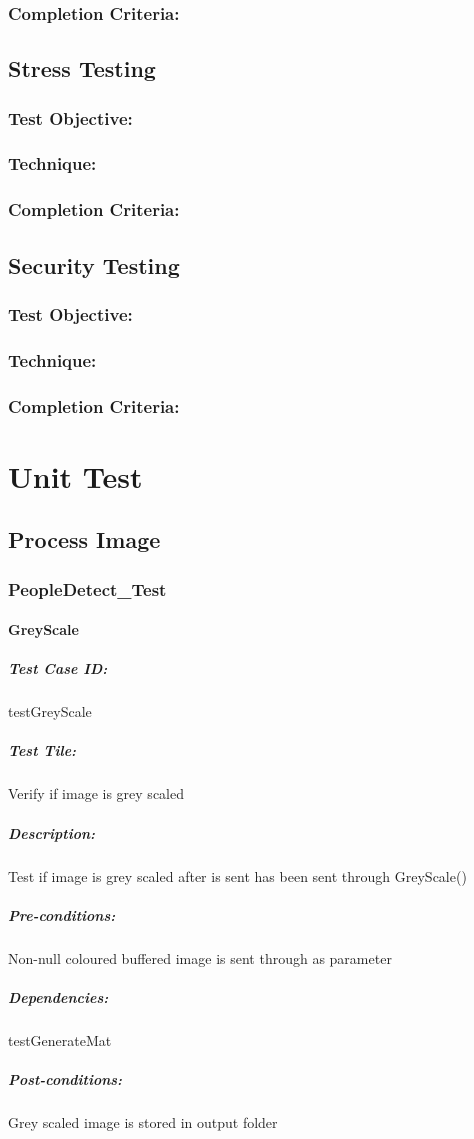 \documentclass[a4paper,12pt]{report}
\begin{document}
			\subsubsection {Completion Criteria:}
			
		\subsection {Stress Testing}
			\subsubsection {Test Objective:}
			\subsubsection {Technique:}
			\subsubsection {Completion Criteria:}
			
		\subsection {Security Testing}
			\subsubsection {Test Objective:}
			\subsubsection {Technique:}
			\subsubsection {Completion Criteria:}

\section {Unit Test}
	\subsection {Process Image}
		\subsubsection {PeopleDetect\_Test}
			\paragraph {GreyScale}
				\subparagraph {Test Case ID:}
					testGreyScale
				\subparagraph {Test Tile:}
					Verify if image is grey scaled
				\subparagraph {Description:}
					Test if image is grey scaled after is sent has been sent through GreyScale()
				\subparagraph {Pre-conditions:}
					Non-null coloured buffered image is sent through as parameter
				\subparagraph {Dependencies:}
					testGenerateMat				
				\subparagraph {Post-conditions:}
					Grey scaled image is stored in output folder
					
\end{document}
